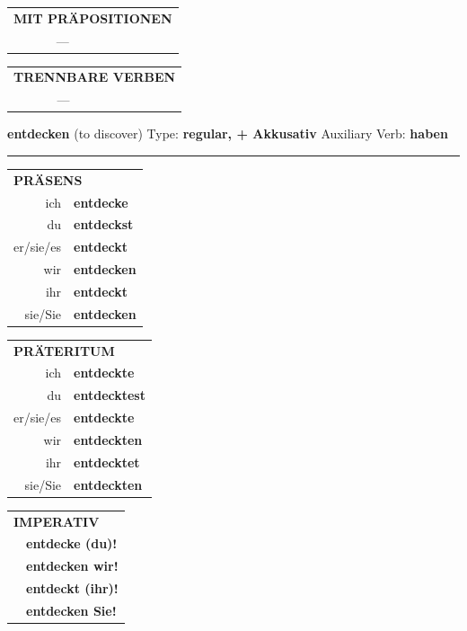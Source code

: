\documentclass[10pt,a4paper]{revtex4-2}
\begin{document}
\begin{verbbox-acc}
\vspace{10pt}

\begin{tabular}{lll}
\multicolumn{3}{l}{\textbf{MIT PRÄPOSITIONEN}}\\
& ---\\
\end{tabular}
\hfill
\begin{tabular}{lll}
\multicolumn{3}{l}{\textbf{TRENNBARE VERBEN}}\\
& ---\\
\end{tabular}

\vspace{-5pt}
\end{verbbox-acc}

\begin{verbbox-acc}
{\Large \bf entdecken} (to discover) \hfill Type: \textbf{regular, + Akkusativ} \hfill Auxiliary Verb: \textbf{haben}

\vspace{5pt}
\hrule
\vspace{5pt}

\begin{tabular}{rl}
\multicolumn{2}{l}{\textbf{PRÄSENS}}\\
ich & \textbf{entdecke}\\
du & \textbf{entdeckst}\\
er/sie/es & \textbf{entdeckt}\\
wir & \textbf{entdecken}\\
ihr & \textbf{entdeckt}\\
sie/Sie & \textbf{entdecken}\\
\end{tabular}
\hfill
\begin{tabular}{rl}
\multicolumn{2}{l}{\textbf{PRÄTERITUM}}\\
ich & \textbf{entdeckte}\\
du & \textbf{entdecktest}\\
er/sie/es & \textbf{entdeckte}\\
wir & \textbf{entdeckten}\\
ihr & \textbf{entdecktet}\\
sie/Sie & \textbf{entdeckten}\\
\end{tabular}
\hfill
\begin{tabular}{rl}
\multicolumn{2}{l}{\textbf{IMPERATIV}}\\
& \textbf{entdecke (du)!}\\
& \textbf{entdecken wir!}\\
& \textbf{entdeckt (ihr)!}\\
& \textbf{entdecken Sie!}\\
\end{tabular}


\end{verbbox-acc}
\end{document}
